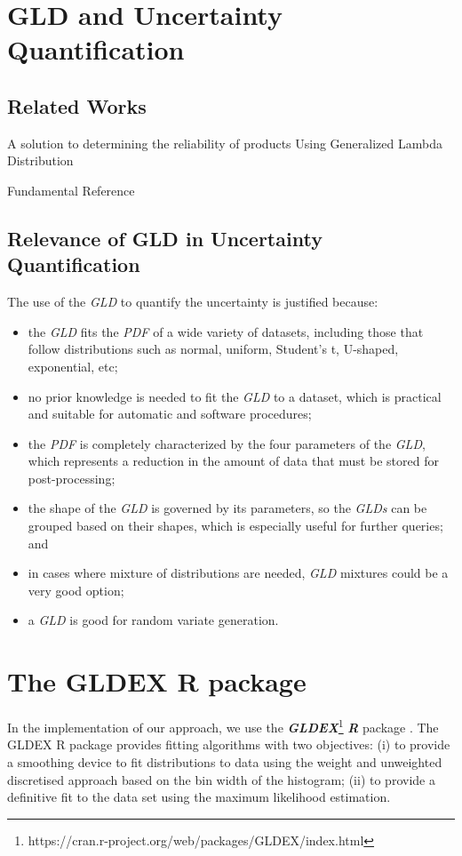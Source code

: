 \section{GLD and Uncertainty Quantification}
\subsection{Related Works}
A solution to determining the reliability of products Using Generalized Lambda Distribution \cite{Movahedi2013}

Fundamental Reference \cite{Lampasi2006}

\cite{Cox2012}

\subsection{Relevance of GLD in Uncertainty Quantification}
The use of the \textit{GLD} to quantify the uncertainty is justified because: 
\begin{itemize}
\item the \textit{GLD} fits the \textit{PDF} of a wide variety of datasets, including those that follow distributions such as normal, uniform, Student's t, U-shaped, exponential, etc;
\item no prior knowledge is needed to fit the \textit{GLD} to a dataset, which is practical and suitable for automatic and software procedures;
\item the \textit{PDF} is completely characterized by the four parameters of the \textit{GLD}, which represents a reduction in the amount of data that must be stored for post-processing;
\item the shape of the \textit{GLD} is governed by its parameters, so the \textit{GLDs} can be grouped  based on their shapes, which is especially useful for further queries; and
\item in cases where mixture of distributions are needed, \textit{GLD} mixtures could be a very good option;
\item a \textit{GLD} is good for random variate generation.
\end{itemize}
\cite{Ning2008} 

\section{The GLDEX R package}\label{sec:gldex}
In the implementation of our approach, we use the \textbf{\textit{GLDEX}}\footnote{https://cran.r-project.org/web/packages/GLDEX/index.html} \textbf{\textit{R}} package \cite{Su2007}. The GLDEX R package provides fitting algorithms with two objectives: (i) to provide a smoothing device to fit distributions to data using the weight and unweighted discretised approach based on the bin width of the histogram; (ii)  to provide a definitive fit to the data set using the maximum likelihood estimation.

